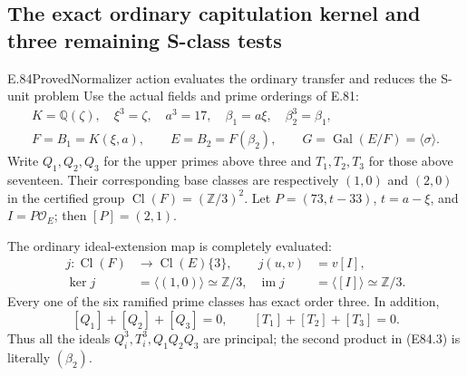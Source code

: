 \subsection{The exact ordinary capitulation kernel and three remaining S-class tests}

\begin{statement}{E.84}{Proved}{Normalizer action evaluates the ordinary transfer and reduces the S-unit problem}
Use the actual fields and prime orderings of E.81:
\[
 \begin{gathered}
 K=\mathbb Q(\zeta),\quad \xi^3=\zeta,\quad a^3=17,\quad
 \beta_1=a\xi,\quad \beta_2^3=\beta_1,\\
 F=B_1=K(\xi,a),\qquad E=B_2=F(\beta_2),\qquad
 G=\operatorname{Gal}(E/F)=\langle\sigma\rangle .
 \end{gathered}
 \tag{E84.1}
\]
Write \(Q_1,Q_2,Q_3\) for the upper primes above three and
\(T_1,T_2,T_3\) for those above seventeen. Their corresponding
base classes are respectively \((1,0)\) and \((2,0)\) in the
certified group \(\operatorname{Cl}(F)=(\mathbb Z/3)^2\).
Let \(P=(73,t-33)\), \(t=a-\xi\), and \(I=P\mathcal O_E\);
then \([P]=(2,1)\).

The ordinary ideal-extension map is completely evaluated:
\[
 \begin{aligned}
 j:\operatorname{Cl}(F)&\longrightarrow\operatorname{Cl}(E)\{3\},
       &j(u,v)&=v[I],\\
 \ker j&=\langle(1,0)\rangle\simeq\mathbb Z/3,
       &\operatorname{im}j&=\langle[I]\rangle\simeq\mathbb Z/3.
 \end{aligned}
 \tag{E84.2}
\]
Every one of the six ramified prime classes has exact order
three. In addition,
\[
 [Q_1]+[Q_2]+[Q_3]=0,\qquad
 [T_1]+[T_2]+[T_3]=0.
 \tag{E84.3}
\]
Thus all the ideals \(Q_i^3,T_i^3,Q_1Q_2Q_3\) are principal;
the second product in (E84.3) is literally \((\beta_2)\).


\end{statement}
